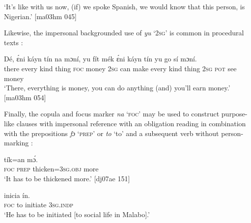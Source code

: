 \glt ‘It’s like with us now, (if) we spoke Spanish, we would know
that this person, is Nigerian.’ [ma03hm 045]
\z

Likewise, the impersonal backgrounded use of \textit{yu} ‘\textsc{2sg}’ is common in procedural texts :


\ea%
    \label{ex:key:1352}
    \gll Dé,    ɛ́ni    káyn  tín    na  mɔní,  yu  fít  mék
ɛ́ni    káyn  tín    yu  go  sí  mɔní.\\
there  every  kind    thing  \textsc{foc}  money  \textsc{2sg}  can  make
every  kind    thing  \textsc{2sg}  \textsc{pot}  see  money\\

\glt ‘There, everything is money, you can do anything (and) 
you’ll earn money.’ [ma03hm 054]
\z

Finally, the copula and focus marker \textit{na} ‘\textsc{foc}’ may be used to construct purpose-like clauses with impersonal reference with an obligation reading in combination with the prepositions \textit{fɔ} ‘\textsc{prep}’ or \textit{to} ‘to’ and a subsequent verb without person-marking :


\ea%
    \label{ex:key:1353}
    \gll {}   tík=an      mɔ́.\\
\textsc{foc}  \textsc{prep}  thicken=\textsc{3sg.obj}  more\\

\glt ‘It has to be thickened more.’ [dj07ae 151]
\z


\ea%
    \label{ex:key:1354}
    \gll {}   inicia  ín.\\
\textsc{foc}  to  initiate  \textsc{3sg.indp}\\

\glt ‘He has to be initiated [to social life in Malabo].’
\z

